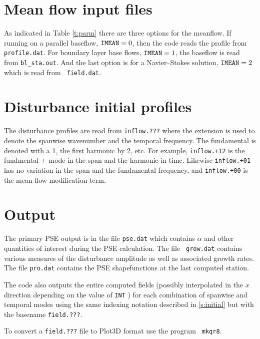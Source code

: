 \documentclass[10pt]{article}
\newcommand{\pse}{\textsf{PSE}\xspace}
\begin{document}
\section*{Mean flow input files}

As indicated in Table \ref{t:parm} there are three options for the meanflow.
If running on a parallel baseflow, ${\tt IMEAN}=0$, then the code reads the
profile from {\tt profile.dat}.  For boundary layer base flows, ${\tt
IMEAN}=1$, the baseflow is read from {\tt bl\_sta.out}.  And the last option is
for a Navier--Stokes solution, ${\tt IMEAN}=2$ which is read from {\tt
field.dat}.

\section*{Disturbance initial profiles} \label{s:initial}

The disturbance profiles are read from {\tt inflow.???} where the extension is
used to denote the spanwise wavenumber and the temporal frequency.  The
fundamental is denoted with a 1, the first harmonic by 2, etc.  For example,
{\tt inflow.+12} is the fundmental $+$ mode in the span and the harmonic in
time.  Likewise {\tt inflow.+01} has no variation in the span and the
fundamental frequency, and {\tt inflow.+00} is the mean flow modification
term.

\section*{Output}

The primary \pse output is in the file {\tt pse.dat} which contains $\alpha$
and other quantities of interest during the \pse calculation.  The file {\tt
grow.dat} contains various measures of the disturbance amplitude as well as
associated growth rates.  The file {\tt pro.dat} contains the \pse
shapefunctions at the last computed station.

The code also outputs the entire computed fields (possibly interpolated in the
$x$ direction depending on the value of {\tt INT} ) for each combination of
spanwise and temporal modes using the same indexing notation described in
\ref{s:initial} but with the basename {\tt field.???}.

To convert a {\tt field.???} file to Plot3D format use the program {\tt
mkqr8}.
\end{document}
